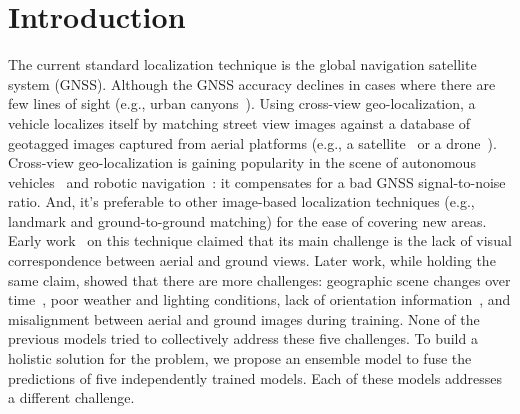 \documentclass[10pt,letterpaper]{article}
\begin{document}
\section*{Introduction}
The current standard localization technique is the global navigation satellite system (GNSS). Although the GNSS accuracy declines in cases where there are few lines of sight (e.g., urban canyons~\cite{bib1}). Using cross-view geo-localization, a vehicle localizes itself by matching street view images against a database of geotagged images captured from aerial platforms (e.g., a satellite~\cite{bib2} or a drone~\cite{bib3}). Cross-view geo-localization is gaining popularity in the scene of autonomous vehicles~\cite{bib2} and robotic navigation~\cite{bib25}: it compensates for a bad GNSS signal-to-noise ratio. And,  it’s preferable to other image-based localization techniques (e.g., landmark and ground-to-ground matching) for the ease of covering new areas. Early work~\cite{bib37} on this technique claimed that its main challenge is the lack of visual correspondence between aerial and ground views. Later work, while holding the same claim, showed that there are more challenges: geographic scene changes over time~\cite{bib6,bib7,bib8,bib9,bib10}, poor weather and lighting conditions, lack of orientation information~\cite{bib4}, and misalignment between aerial and ground images during training.
None of the previous models tried to collectively address these five challenges. To build a holistic solution for the problem, we propose an ensemble model to fuse the predictions of five independently trained models. Each of these models addresses a different challenge.
\end{document}
